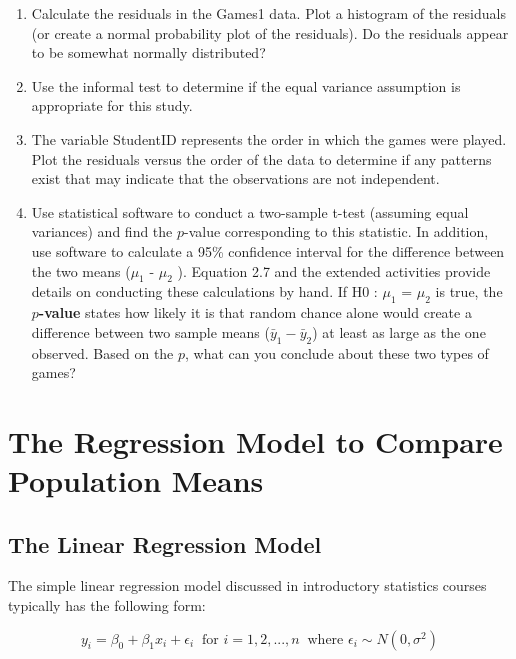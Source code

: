 \documentclass[
]{report}
\providecommand{\tightlist}{%
  \setlength{\itemsep}{0pt}\setlength{\parskip}{0pt}}
\begin{document}
\begin{enumerate}
\def\labelenumi{\arabic{enumi}.}
\setcounter{enumi}{6}
\tightlist
\item
  Calculate the residuals in the Games1 data. Plot a histogram of the residuals (or create a normal probability plot of the residuals). Do the residuals appear to be somewhat normally distributed?
\item
  Use the informal test to determine if the equal variance assumption is appropriate for this study.
\item
  The variable StudentID represents the order in which the games were played. Plot the residuals versus the order of the data to determine if any patterns exist that may indicate that the observations are
  not independent.
\item
  Use statistical software to conduct a two-sample t-test (assuming equal variances) and find the \(p\)-value corresponding to this statistic. In addition, use software to calculate a 95\% confidence interval for
  the difference between the two means (\(\mu_1\) - \(\mu_2\) ). Equation 2.7 and the extended activities provide details on conducting these calculations by hand. If H0 : \(\mu_1\) = \(\mu_2\) is true, the \textbf{\(p\)-value} states how likely it is that random chance alone would create a difference between two sample means (\(\bar{y}_1 - \bar{y}_2\)) at least as large as the one observed. Based on the \(p\), what can you conclude about these two types of
  games?
\end{enumerate}

\newpage

\hypertarget{the-regression-model-to-compare-population-means}{%
\section{The Regression Model to Compare Population Means}\label{the-regression-model-to-compare-population-means}}

\hypertarget{the-linear-regression-model}{%
\subsection{The Linear Regression Model}\label{the-linear-regression-model}}

The simple linear regression model discussed in introductory statistics courses typically has the following form:

\begin{equation} \label{2.2}
y_i = \beta_0 + \beta_1x_i + \epsilon_i ~\text{ for } i = 1, 2, ... , n ~\text{ where } \epsilon_i \sim N(0,\sigma^2)
\tag{2.2}
\end{equation}
\end{document}
